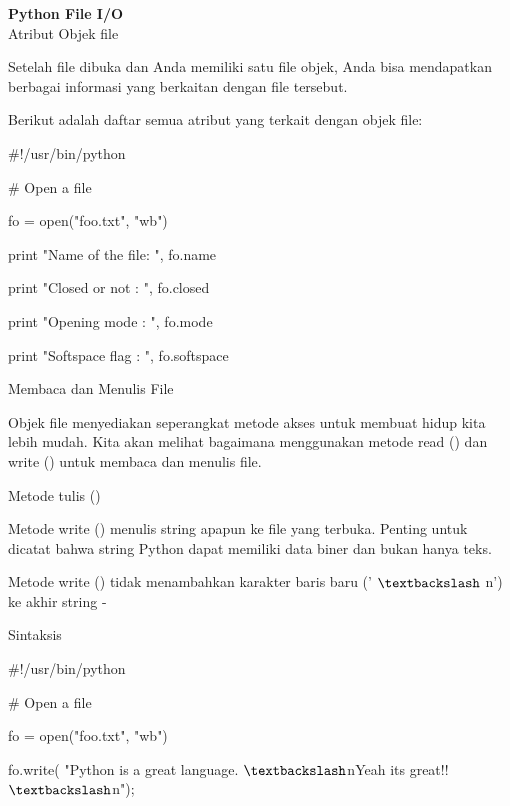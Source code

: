 \begin{center}{\fontsize{24pt}{24pt}\selectfont \textbf{Python File I/O} \\}
Atribut Objek file 
\vspace{12pt}
 
Setelah file dibuka dan Anda memiliki satu file objek, Anda bisa mendapatkan berbagai informasi yang berkaitan dengan file tersebut. 
\vspace{12pt}

Berikut adalah daftar semua atribut yang terkait dengan objek file:
\vspace{16pt}
\vspace{16pt}
\vspace{16pt}

 $  \#  $!/usr/bin/python 
\vspace{12pt}
 
 $  \#  $ Open a file 
 
fo = open("foo.txt", "wb") 

print "Name of the file: ", fo.name 

print "Closed or not : ", fo.closed 

print "Opening mode : ", fo.mode 

print "Softspace flag : ", fo.softspace 
\vspace{12pt}

Membaca dan Menulis File 
\vspace{12pt}

Objek file menyediakan seperangkat metode akses untuk membuat hidup kita lebih mudah. Kita akan melihat bagaimana menggunakan metode read () dan write () untuk membaca dan menulis file. 

Metode tulis () 
\vspace{12pt}

Metode write () menulis string apapun ke file yang terbuka. Penting untuk dicatat bahwa string Python dapat memiliki data biner dan bukan hanya teks. 
\vspace{12pt}

Metode write () tidak menambahkan karakter baris baru (' $  \textbackslash  $ n') ke akhir string - 

Sintaksis 
\vspace{12pt}
 
 $  \#  $!/usr/bin/python 
\vspace{12pt}

 $  \#  $ Open a file 
 
fo = open("foo.txt", "wb") 

fo.write( "Python is a great language. $  \textbackslash  $nYeah its great!! $  \textbackslash  $n"); 
\vspace{12pt}


\end{center}
